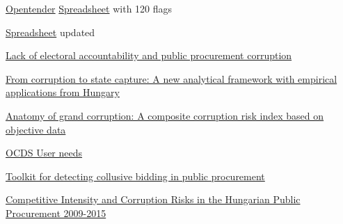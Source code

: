 \documentclass{book}
\begin{document}
\href{https://opentender.eu/start}{Opentender}
\href{https://docs.google.com/spreadsheets/d/19OTpHcl92GHixsX31IfpDbs-jCnNr9KyDqu1cr38xsY/edit#gid=0}{Spreadsheet} with 120 flags

\href{https://docs.google.com/spreadsheets/d/12PFkUlQH09jQvcnORjcbh9-8d-NnIuk4mAQwdGiXeSM/edit#gid=656314485}{Spreadsheet} updated 

\href{https://docs.google.com/document/d/14sKj037Mn93k__CVIgzfLaUMmwufa67_fyWIGLU6Vog/edit}{Lack of electoral accountability and public procurement corruption} 

\href{https://www.crcb.eu/wp-content/uploads/2014/11/Fazekas-Toth_State_capture_PP_2014Nov.pdf}{From corruption to state capture: A new analytical framework with empirical applications from Hungary}

\href{https://www.crcb.eu/wp-content/uploads/2013/12/Fazekas-Toth-King_Composite-indicator_v2_2013.pdf}{Anatomy of grand corruption: A composite corruption risk index based on objective data}

\href{https://standard.open-contracting.org/latest/en/guidance/design/user_needs/#value-for-money-in-procurement}{OCDS User needs}

\href{https://www.crcb.eu/wp-content/uploads/2015/04/Toth-et-al_CRCB_WP_v2_150413.pdf}{Toolkit for detecting collusive bidding in public procurement}

\href{https://www.crcb.eu/wp-content/uploads/2016/08/crcb_2016_ijtoth_mhajdu_competitive_intensity_160820_.pdf}{Competitive Intensity and Corruption Risks in the Hungarian Public Procurement 2009-2015}
\end{document}
